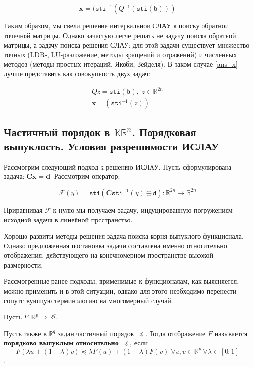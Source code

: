 \begin{equation} \label{ans_x}
\mathbf{x} = (\mathtt{sti} ^ {-1}( Q\tilde{}^{-1}(\mathtt{sti}(\mathbf{b})))
\end{equation}

Таким образом, мы свели решение интервальной СЛАУ к поиску обратной точечной матрицы. Однако зачастую легче решать не задачу поиска обратной матрицы, а задачу поиска решения СЛАУ: для этой задачи существует множество точных (LDR-, LU-разложение, методы вращений и отражений) и численных методов (методы простых итераций, Якоби, Зейделя). В таком случае \ref{ans_x} лучше представить как совокупность двух задач:

\begin{align} \label{ans_b}
Q\tilde{} z = \mathtt{sti}(\mathbf{b}), \; z \in \mathbb{R}^{2n} \\
\mathbf{x} = (\mathtt{sti} ^ {-1}(z))
\end{align}

\subsection{Частичный порядок в $\mathbb{KR}^n$. Порядковая выпуклость. Условия разрешимости ИСЛАУ}

Рассмотрим следующий подход к решению ИСЛАУ.
Пусть сформулирована задача: $\mathbf{Cx}=\mathbf{d}$.
Рассмотрим оператор:

\begin{equation}
\mathcal{F}(y)=\mathtt{sti}(\mathbf{C}\mathtt{sti}^{-1}(y) \ominus \mathtt{d}): \mathbb{R}^{2n} \rightarrow \mathbb{R}^{2n}
\end{equation}

Приравнивая $\mathcal{F}$ к нулю мы получаем задачу, индуцированную погружением исходной задачи в линейной пространство.

Хорошо развиты методы решения задача поиска корня выпуклого функционала. Однако предложенная постановка задачи составлена именно относительно отображения, действующего на конечномерном пространстве высокой размерности.

Рассмотренные ранее подходы, применимые к функционалам, как выясняется, можно применить и в этой ситуации, однако для этого необходимо перенести сопутствующую терминологию на многомерный случай.

\begin{definition}
	Пусть $F: \mathbb{R}^p \rightarrow \mathbb{R}^q$.
	
	Пусть также в $\mathbb{R}^q$ задан частичный порядок $\preccurlyeq$. Тогда отображение $F$ называется \textbf{порядково выпуклым относительно $\preccurlyeq$}, если
	\begin{equation*}
	F(\lambda u + (1 - \lambda) v) \preccurlyeq \lambda F(u) + (1 - \lambda) F(v) \; \forall u, v \in \mathbb{R}^p \; \forall \lambda \in [0; 1]
	\end{equation*}.
\end{definition}

